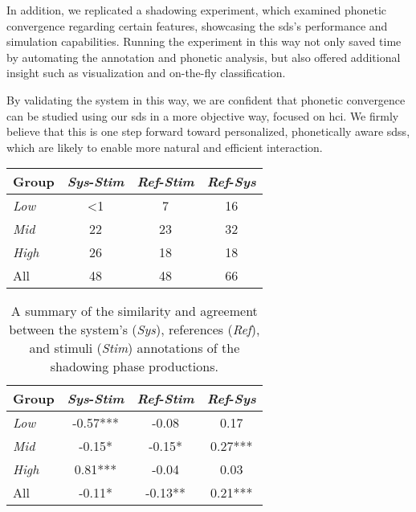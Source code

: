 In addition, we replicated a shadowing experiment, which examined phonetic convergence regarding certain features, showcasing the \ac{sds}'s performance and simulation capabilities.
Running the experiment in this way not only saved time by automating the annotation and phonetic analysis, but also offered additional insight such as visualization and on-the-fly classification.

By validating the system in this way, we are confident that phonetic convergence can be studied using our \ac{sds} in a more objective way, focused on \ac{hci}.
We firmly believe that this is one step forward toward personalized, phonetically aware \acp{sds}, which are likely to enable more natural and efficient interaction.

\begin{table}[t]
	\centering
		\begin{tabularx}{\linewidth}{X*{3}{S[table-format=2.0]}}
			\toprule
			Group & {\emph{Sys}-\emph{Stim}} & {\emph{Ref}-\emph{Stim}} & {\emph{Ref}-\emph{Sys}} \\
			\midrule
			\emph{Low}  & {<1} &  7 & 16 \\
			\emph{Mid}  &  22  & 23 & 32 \\
			\emph{High} &  26  & 18 & 18 \\
			All   		&  48  & 48 & 66 \\
			\bottomrule
		\end{tabularx}
		\label{tab:validation_shadow_similarity}
\end{table}
\begin{table}
		\begin{tabularx}{\linewidth}{X*{3}{S[table-format=2.2]}@{\quad}}
			\toprule
			Group & {\emph{Sys}-\emph{Stim}} & {\emph{Ref}-\emph{Stim}} & {\emph{Ref}-\emph{Sys}} \\
			\midrule
			\emph{Low}  & -0.57*** & -0.08   & 0.17    \\
			\emph{Mid}  & -0.15*   & -0.15*  & 0.27*** \\
			\emph{High} &  0.81*** & -0.04   & 0.03    \\
			All   		& -0.11*   & -0.13** & 0.21*** \\
			\bottomrule
		\end{tabularx}
		\label{tab:validation_shadow_kappa}
	\caption[Similarity and agreement evaluation of system and stimulus sets]{A summary of the similarity and agreement between the system's (\emph{Sys}), references (\emph{Ref}), and stimuli (\emph{Stim}) annotations of the shadowing phase productions.}
	\label{tab:validation_shadow}
\end{table}


